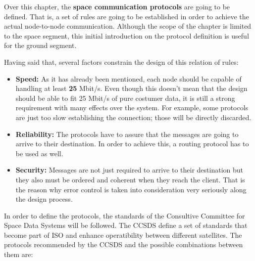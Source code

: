 Over this chapter, the \textbf{space communication protocols} are going to be defined. That is, a set of rules are going to be established in order to achieve the actual node-to-node communication. Although the scope of the chapter is limited to the space segment, this initial introduction on the protocol definition is useful for the ground segment.

Having said that, several factors constrain the design of this relation of rules:

\begin{itemize}
\renewcommand{\labelitemi}{\scriptsize$\blacksquare$} 
\item \textbf{Speed:} As it has already been mentioned, each node should be capable of handling at least \textbf{25} Mbit/s. Even though this doesn't mean that the design should be able to fit 25 Mbit/s of pure costumer data, it is still a strong requirement with many effects over the system. For example, some protocols are just too slow establishing the connection; those will be directly discarded.

\item \textbf{Reliability:} The protocols have to assure that the messages are going to arrive to their destination. In order to achieve this, a routing protocol has to be used as well.

\item \textbf{Security:} Messages are not just required to arrive to their destination but they also must be ordered and coherent when they reach the client. That is the reason why error control is taken into consideration very seriously along the design process.
\end{itemize}
In order to define the protocols, the standards of the Consultive Committee for Space Data Systems will be followed. The CCSDS define a set of standards that become part of ISO and enhance operatibility between different satellites. The protocols recommended by the CCSDS and the possible combinations between them are:
